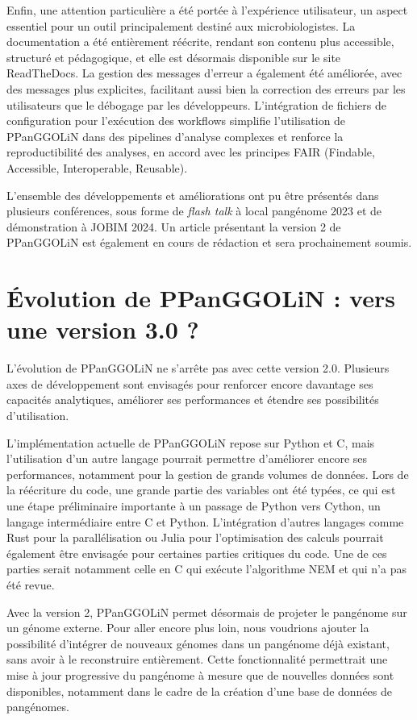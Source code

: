 Enfin, une attention particulière a été portée à l’expérience utilisateur, un aspect essentiel pour un outil principalement destiné aux microbiologistes. La documentation a été entièrement réécrite, rendant son contenu plus accessible, structuré et pédagogique, et elle est désormais disponible sur le site ReadTheDocs. La gestion des messages d’erreur a également été améliorée, avec des messages plus explicites, facilitant aussi bien la correction des erreurs par les utilisateurs que le débogage par les développeurs. L’intégration de fichiers de configuration pour l’exécution des workflows simplifie l’utilisation de PPanGGOLiN dans des pipelines d’analyse complexes et renforce la reproductibilité des analyses, en accord avec les principes FAIR (Findable, Accessible, Interoperable, Reusable).

L'ensemble des développements et améliorations ont pu être présentés dans plusieurs conférences, sous forme de \textit{flash talk} à local pangénome 2023 \cite{mainguy_ppanggolin_2023} et de démonstration à JOBIM 2024. Un article présentant la version 2 de PPanGGOLiN est également en cours de rédaction et sera prochainement soumis.

\section{Évolution de PPanGGOLiN : vers une version 3.0 ?}

L’évolution de PPanGGOLiN ne s’arrête pas avec cette version 2.0. Plusieurs axes de développement sont envisagés pour renforcer encore davantage ses capacités analytiques, améliorer ses performances et étendre ses possibilités d’utilisation.

L’implémentation actuelle de PPanGGOLiN repose sur Python et C, mais l’utilisation d’un autre langage pourrait permettre d’améliorer encore ses performances, notamment pour la gestion de grands volumes de données. Lors de la réécriture du code, une grande partie des variables ont été typées, ce qui est une étape préliminaire importante à un passage de Python vers Cython, un langage intermédiaire entre C et Python. L'intégration d'autres langages comme Rust pour la parallélisation ou Julia pour l’optimisation des calculs pourrait également être envisagée pour certaines parties critiques du code. Une de ces parties serait notamment celle en C qui exécute l'algorithme NEM et qui n'a pas été revue. 

Avec la version 2, PPanGGOLiN permet désormais de projeter le pangénome sur un génome externe. Pour aller encore plus loin, nous voudrions ajouter la possibilité d'intégrer de nouveaux génomes dans un pangénome déjà existant, sans avoir à le reconstruire entièrement. Cette fonctionnalité permettrait une mise à jour progressive du pangénome à mesure que de nouvelles données sont disponibles, notamment dans le cadre de la création d'une base de données de pangénomes.

